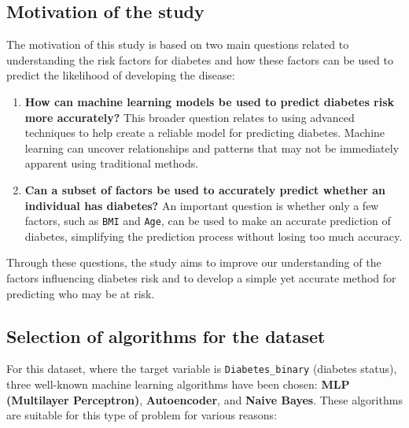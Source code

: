 \subsection{Motivation of the study}

The motivation of this study is based on two main questions related to understanding the risk factors for diabetes and how these factors can be used to predict the likelihood of developing the disease:

\begin{enumerate}    
    \item \textbf{How can machine learning models be used to predict diabetes risk more accurately?} This broader question relates to using advanced techniques to help create a reliable model for predicting diabetes. Machine learning can uncover relationships and patterns that may not be immediately apparent using traditional methods.

    \item \textbf{Can a subset of factors be used to accurately predict whether an individual has diabetes?} An important question is whether only a few factors, such as \texttt{BMI} and \texttt{Age}, can be used to make an accurate prediction of diabetes, simplifying the prediction process without losing too much accuracy. 
\end{enumerate}

Through these questions, the study aims to improve our understanding of the factors influencing diabetes risk and to develop a simple yet accurate method for predicting who may be at risk.


\subsection{Selection of algorithms for the dataset}

For this dataset, where the target variable is \texttt{Diabetes\_binary} (diabetes status), three well-known machine learning algorithms have been chosen: \textbf{MLP (Multilayer Perceptron)}, \textbf{Autoencoder}, and \textbf{Naive Bayes}. These algorithms are suitable for this type of problem for various reasons:


